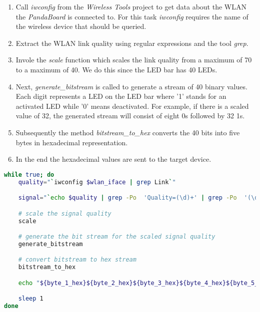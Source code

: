 \begin{enumerate} 

\item Call \textit{iwconfig} from the \textit{Wireless Tools} project to get data about the WLAN the \textit{PandaBoard} is connected to. For this task \textit{iwconfig} requires the name of the wireless device that should be queried.

\item Extract the WLAN link quality using regular expressions and the tool \textit{grep}.

\item Invole the \textit{scale} function which scales the link quality from a maximum of 70 to a maximum of 40. We do this since the LED bar has 40 LEDs.

\item Next, \textit{generate\_bitstream} is called to generate a stream of 40 binary values. Each digit represents a LED on the LED bar where '1' stands for an activated LED while '0' means deactivated. For example, if there is a scaled value of 32, the generated stream will consist of eight 0s followed by 32 1s.

\item Subsequently the method \textit{bitstream\_to\_hex} converts the 40 bits into five bytes in hexadecimal representation.

\item In the end the hexadecimal values are sent to the target device.

\end{enumerate}


\begin{lstlisting}[language=bash, caption=Bash application main loop, label=wlan_info_bash_main_loop]
while true; do
	quality="`iwconfig $wlan_iface | grep Link`"

	signal="`echo $quality | grep -Po  'Quality=(\d)+' | grep -Po  '(\d)+' `"

	# scale the signal quality
	scale

	# generate the bit stream for the scaled signal quality
	generate_bitstream

	# convert bitstream to hex stream
	bitstream_to_hex

	echo "${byte_1_hex}${byte_2_hex}${byte_3_hex}${byte_4_hex}${byte_5_hex}" > $out_device

	sleep 1
done
\end{lstlisting}




